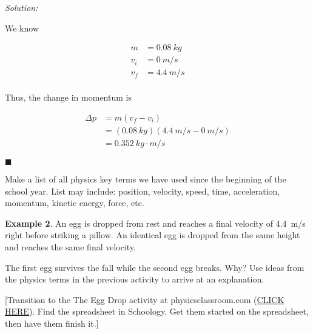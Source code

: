 \documentclass[dvipsnames]{article}
\begin{document}
\textit{Solution:}

We know

\vspace{-1em}
\begin{align*}
    m &= \SI{0.08}{kg} \\[1ex]
    v_i &= \SI{0}{m/s} \\[1ex]
    v_f &= \SI{4.4}{m/s} \\[1ex]
\end{align*}

Thus, the change in momentum is

\vspace{-1em}
\begin{align*}
    \Delta p &= m (v_f - v_i) \\[1ex]
    &= (\SI{0.08}{kg})(\SI{4.4}{m/s} - \SI{0}{m/s}) \\[1ex]
    &= \boxed{\SI{0.352}{kg\cdot m/s}}
\end{align*}

\hfill $\blacksquare$

Make a list of all physics key terms we have used since the beginning of the school year. List may include: position, velocity, speed, time, acceleration, momentum, kinetic energy, force, etc. 

\textbf{Example 2}. An egg is dropped from rest and reaches a final velocity of \SI{4.4}{m/s} right before striking a pillow. An identical egg is dropped from the same height and reaches the same final velocity. 

\begin{center}
\hspace{2cm}
\end{center}

The first egg survives the fall while the second egg breaks. Why? Use ideas from the physics terms in the previous activity to arrive at an explanation.

[Transition to the The Egg Drop activity at physicsclassroom.com (\href{https://www.physicsclassroom.com/physics-interactives/momentum-and-collisions/egg-drop/egg-drop-interactive}{CLICK HERE}). Find the spreadsheet in Schoology. Get them started on the spreadsheet, then have them finish it.]
\end{document}
